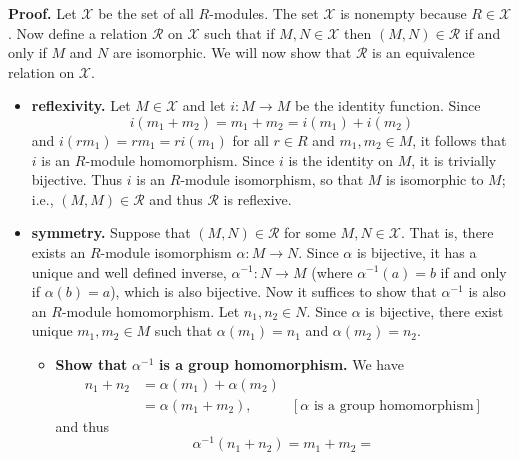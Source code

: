 \documentclass[9pt]{article}
\begin{document}
\begin{enumerate}
      \textbf{Proof.} Let $\mathscr{X}$ be the set of all $R$-modules. The set
      $\mathscr{X}$ is nonempty because $R \in \mathscr{X}$. Now define a
      relation $\mathcal{R}$ on $\mathscr{X}$ such that if
      $M, N \in \mathscr{X}$ then $(M, N) \in \mathcal{R}$ if and only if $M$
      and $N$ are isomorphic. We will now show that $\mathcal{R}$ is an
      equivalence relation on $\mathscr{X}$.
      \begin{itemize}
         \item \textbf{reflexivity.} Let $M \in \mathscr{X}$ and let
               $i : M \rightarrow M$ be the identity function. Since
               $$i(m_1 + m_2) = m_1 + m_2 = i(m_1) + i(m_2)$$
               and
               $i(rm_1) = rm_1 = ri(m_1)$ for all $r \in R$ and
               $m_1, m_2 \in M$, it follows that $i$ is an $R$-module
               homomorphism. Since $i$ is the identity on $M$, it is trivially
               bijective. Thus $i$ is an $R$-module isomorphism, so that $M$ is
               isomorphic to $M$; i.e., $(M, M) \in \mathcal{R}$ and thus
               $\mathcal{R}$ is reflexive.
         \item \textbf{symmetry.} Suppose that $(M, N) \in \mathcal{R}$ for some
               $M, N \in \mathscr{X}$. That is, there exists an $R$-module
               isomorphism $\alpha : M \rightarrow N$. Since $\alpha$ is
               bijective, it has a unique and well defined inverse,
               $\alpha^{-1} : N \rightarrow M$ (where $\alpha^{-1}(a) = b$ if
               and only if $\alpha(b) = a$), which is also bijective. Now it
               suffices to show that $\alpha^{-1}$ is also an $R$-module
               homomorphism. Let $n_1, n_2 \in N$. Since $\alpha$ is bijective,
               there exist unique $m_1, m_2 \in M$ such that $\alpha(m_1) = n_1$
               and $\alpha(m_2) = n_2$.
               \begin{itemize}
                  \item \textbf{Show that } $\alpha^{-1}$
                        \textbf{is a group homomorphism.} We have
                        \begin{align*}
                           n_1 + n_2 &= \alpha(m_1) + \alpha(m_2) \\
                              &= \alpha(m_1 + m_2), &[\alpha \text{ is a
                                 group homomorphism}]
                        \end{align*}
                        and thus 
                        $$\alpha^{-1}(n_1 + n_2) = m_1 + m_2 =
$$
\end{itemize}
\end{itemize}
\end{enumerate}
\end{document}
